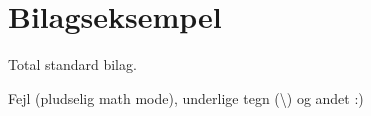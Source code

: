 \chapter{Bilagseksempel}

Total standard bilag.

Fejl (pludselig math mode), underlige tegn (\textbackslash) og andet :)